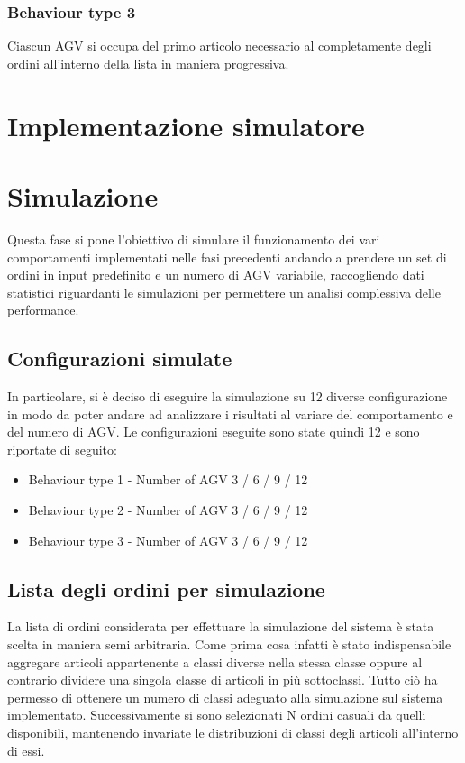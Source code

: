 \documentclass[12pt]{article}
\begin{document}
\subsubsection{Behaviour type 3}
Ciascun AGV si occupa del primo articolo necessario al completamente degli ordini all'interno della lista in maniera progressiva.

\newpage
\section{Implementazione simulatore} 


\newpage
\section{Simulazione} %

Questa fase si pone l'obiettivo di simulare il funzionamento dei vari comportamenti implementati nelle fasi precedenti andando a prendere un set di ordini in input predefinito e un numero di AGV variabile, raccogliendo dati statistici riguardanti le simulazioni per permettere un analisi complessiva delle performance.

\subsection{Configurazioni simulate}
In particolare, si è deciso di eseguire la simulazione su 12 diverse configurazione in modo da poter andare ad analizzare i risultati al variare del comportamento e del numero di AGV.
Le configurazioni eseguite sono state quindi 12 e sono riportate di seguito:
\begin{itemize}
\setlength\itemsep{0.1em}
    \item \textbf{} Behaviour type 1 - Number of AGV 3 / 6 / 9 / 12
    \item \textbf{} Behaviour type 2 - Number of AGV 3 / 6 / 9 / 12
    \item \textbf{} Behaviour type 3 - Number of AGV 3 / 6 / 9 / 12
\end{itemize}

\subsection{Lista degli ordini per simulazione}
La lista di ordini considerata per effettuare la simulazione del sistema è stata scelta in maniera semi arbitraria. Come prima cosa infatti è stato indispensabile aggregare articoli appartenente a classi diverse nella stessa classe oppure al contrario dividere una singola classe di articoli in più sottoclassi. Tutto ciò ha permesso di ottenere un numero di classi adeguato alla simulazione sul sistema implementato. \newline
Successivamente si sono selezionati N ordini casuali da quelli disponibili, mantenendo invariate le distribuzioni di classi degli articoli all'interno di essi.\\
\end{document}
